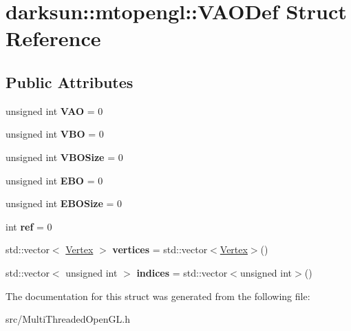 \hypertarget{structdarksun_1_1mtopengl_1_1_v_a_o_def}{}\section{darksun\+::mtopengl\+::V\+A\+O\+Def Struct Reference}
\label{structdarksun_1_1mtopengl_1_1_v_a_o_def}
\subsection*{Public Attributes}
\begin{DoxyCompactItemize}
\item 
\mbox{\label{structdarksun_1_1mtopengl_1_1_v_a_o_def_a349205795e781a39aaeea1c30b206595}} 
unsigned int {\bfseries V\+AO} = 0
\item 
\mbox{\label{structdarksun_1_1mtopengl_1_1_v_a_o_def_ab3cd07119db3873a9bbe5a57f26c76cb}} 
unsigned int {\bfseries V\+BO} = 0
\item 
\mbox{\label{structdarksun_1_1mtopengl_1_1_v_a_o_def_a4027d06ffcb46f8e2ee0868c2a798570}} 
unsigned int {\bfseries V\+B\+O\+Size} = 0
\item 
\mbox{\label{structdarksun_1_1mtopengl_1_1_v_a_o_def_a2d278da40ad3f8bf869f6f7b0998c87e}} 
unsigned int {\bfseries E\+BO} = 0
\item 
\mbox{\label{structdarksun_1_1mtopengl_1_1_v_a_o_def_ade1432f06a8efb1ba2502b6445cef0b4}} 
unsigned int {\bfseries E\+B\+O\+Size} = 0
\item 
\mbox{\label{structdarksun_1_1mtopengl_1_1_v_a_o_def_a7c60c5ae099d61d58ea49ced73d424da}} 
int {\bfseries ref} = 0
\item 
\mbox{\label{structdarksun_1_1mtopengl_1_1_v_a_o_def_a66d8ed9cc6ff8456e7b349f0cc8838ec}} 
std\+::vector$<$ \mbox{\hyperlink{structdarksun_1_1_vertex}{Vertex}} $>$ {\bfseries vertices} = std\+::vector$<$\mbox{\hyperlink{structdarksun_1_1_vertex}{Vertex}}$>$()
\item 
\mbox{\label{structdarksun_1_1mtopengl_1_1_v_a_o_def_af612702c2e2cbfd2f0d903f59c5321ee}} 
std\+::vector$<$ unsigned int $>$ {\bfseries indices} = std\+::vector$<$unsigned int$>$()
\end{DoxyCompactItemize}


The documentation for this struct was generated from the following file\+:\begin{DoxyCompactItemize}
\item 
src/Multi\+Threaded\+Open\+G\+L.\+h\end{DoxyCompactItemize}
